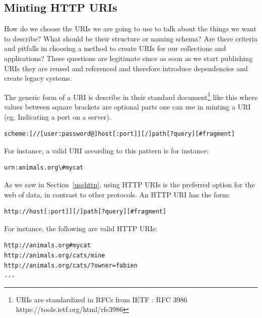 \hypertarget{minting-http-uris}{%
\subsection{Minting HTTP URIs}\label{minting-http-uris}}

How do we choose the URIs we are going to use to talk about the things
we want to describe? What should be their structure or naming schema?
Are there criteria and pitfalls in choosing a method to create URIs for
our collections and applications? These questions are legitimate since
as soon as we start publishing URIs they are reused and referenced and
therefore introduce dependencies and create legacy systems.

The generic form of a URI is describe in their standard
document\footnote{URIs are standardized in RFCs from IETF : RFC 3986
  https://tools.ietf.org/html/rfc3986} like this where values between
square brackets are optional parts one can use in minting a URI (eg.
Indicating a port on a server).

\begin{lstlisting}
scheme:[//[user:password@]host[:port]][/]path[?query][#fragment]
\end{lstlisting}

For instance, a valid URI according to this pattern is for instance:

\begin{lstlisting}
urn:animals.org\#mycat
\end{lstlisting}

As we saw in Section~\ref{usehttp}, using HTTP URIs is the preferred option for the web 
of data, in contrast to other protocols.  An HTTP URI has the form: 


\begin{lstlisting}
http://host[:port]][/]path[?query][#fragment]
\end{lstlisting}


For instance, the following are valid HTTP URIs:

\begin{lstlisting}
http://animals.org#mycat
http://animals.org/cats/mine
http://animals.org/cats/?owner=fabien
...
\end{lstlisting}

